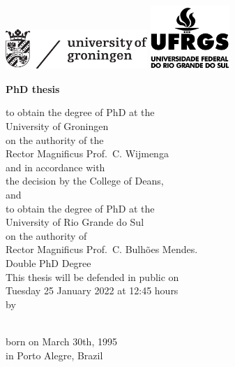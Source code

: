 \thispagestyle{empty}


\begin{addmargin}[-1cm]{-3cm}


\includegraphics[width=5.38cm]{figures/rugr_logoen_zwart_cmyk}
\hfill
\includegraphics[width=3.0cm]{figures/ufrgs-logo.png}



\begin{center}

\large 

\vfill\vfill\vfill\vfill\vfill

{\LARGE\textbf{\myTitle}}

\vfill\vfill\vfill\vfill\vfill

{\Large\textbf{PhD thesis}}

\vfill\vfill\vfill\vfill

to obtain the degree of PhD at the\\
University of Groningen\\
on the authority of the\\
Rector Magnificus Prof.\ C. Wijmenga\\
and in accordance with\\
the decision by the College of Deans,\\
\vfill\vfill
and\\ 
\vfill\vfill
to obtain the degree of PhD at the\\
University of Rio Grande do Sul\\
on the authority of\\
Rector Magnificus Prof.\ C. Bulhões Mendes.\\
\vfill\vfill
Double PhD Degree\\
\vfill\vfill
This thesis will be defended in public on\\
\vfill\vfill
Tuesday 25 January 2022 at 12:45 hours\\
\vfill\vfill\vfill\vfill\vfill\vfill
by
\vfill\vfill\vfill\vfill\vfill\vfill

{\Large\textbf{\myName}}\\

\vfill
born on March 30th, 1995\\
in Porto Alegre, Brazil 
\end{center}
\end{addmargin}

